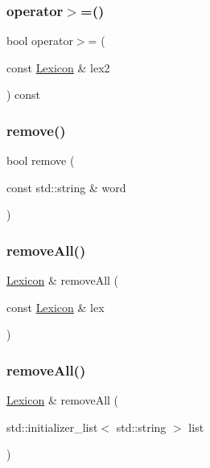 \mbox{\label{classLexicon_a05b7f6593b8b859858cf21ffbc9e5ab1}} 
\subsubsection{\texorpdfstring{operator$>$=()}{operator>=()}}
{\footnotesize\ttfamily bool operator$>$= (\begin{DoxyParamCaption}\item[{const \mbox{\hyperlink{classLexicon}{Lexicon}} \&}]{lex2 }\end{DoxyParamCaption}) const}

\mbox{\label{classLexicon_affc6169b054fb3bbc4d72694e1a5834e}} 
\subsubsection{\texorpdfstring{remove()}{remove()}}
{\footnotesize\ttfamily bool remove (\begin{DoxyParamCaption}\item[{const std\+::string \&}]{word }\end{DoxyParamCaption})}

\mbox{\label{classLexicon_a606a7338945745d8ac9ce21f456f08d9}} 
\subsubsection{\texorpdfstring{remove\+All()}{removeAll()}\hspace{0.1cm}{\footnotesize\ttfamily [1/2]}}
{\footnotesize\ttfamily \mbox{\hyperlink{classLexicon}{Lexicon}} \& remove\+All (\begin{DoxyParamCaption}\item[{const \mbox{\hyperlink{classLexicon}{Lexicon}} \&}]{lex }\end{DoxyParamCaption})}

\mbox{\label{classLexicon_a8ef0b8a849b2d33d83bc9689c4c4d090}} 
\subsubsection{\texorpdfstring{remove\+All()}{removeAll()}\hspace{0.1cm}{\footnotesize\ttfamily [2/2]}}
{\footnotesize\ttfamily \mbox{\hyperlink{classLexicon}{Lexicon}} \& remove\+All (\begin{DoxyParamCaption}\item[{std\+::initializer\+\_\+list$<$ std\+::string $>$}]{list }\end{DoxyParamCaption})}


